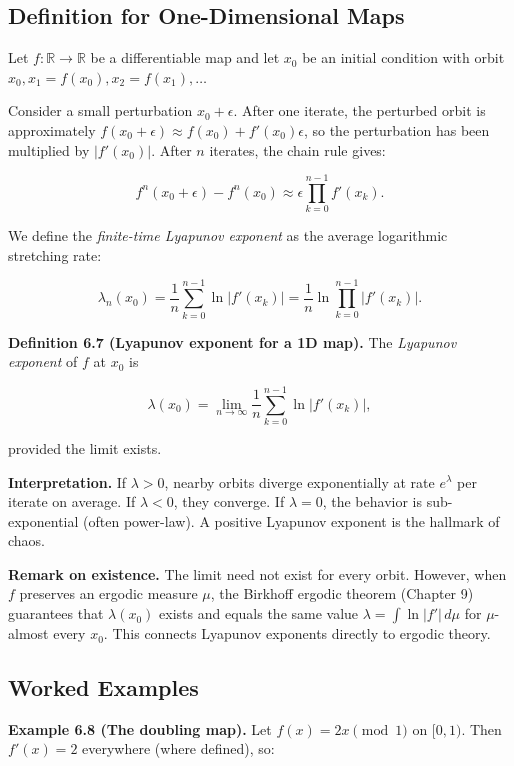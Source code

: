 \subsection{Definition for One-Dimensional Maps}\label{sec:6.3.1}

Let $f: \mathbb{R} \to \mathbb{R}$ be a differentiable map and let $x_0$ be an initial condition with orbit $x_0, x_1 = f(x_0), x_2 = f(x_1), \ldots$

Consider a small perturbation $x_0 + \epsilon$. After one iterate, the perturbed orbit is approximately $f(x_0 + \epsilon) \approx f(x_0) + f'(x_0)\epsilon$, so the perturbation has been multiplied by $|f'(x_0)|$. After $n$ iterates, the chain rule gives:

\[
f^n(x_0 + \epsilon) - f^n(x_0) \approx \epsilon \prod_{k=0}^{n-1} f'(x_k).
\]

We define the \textit{finite-time Lyapunov exponent} as the average logarithmic stretching rate:

\[
\lambda_n(x_0) = \frac{1}{n} \sum_{k=0}^{n-1} \ln |f'(x_k)| = \frac{1}{n} \ln \prod_{k=0}^{n-1} |f'(x_k)|.
\]

\textbf{Definition 6.7 (Lyapunov exponent for a 1D map).} The \textit{Lyapunov exponent} of $f$ at $x_0$ is

\[
\lambda(x_0) = \lim_{n \to \infty} \frac{1}{n} \sum_{k=0}^{n-1} \ln |f'(x_k)|,
\]

provided the limit exists.

\textbf{Interpretation.} If $\lambda > 0$, nearby orbits diverge exponentially at rate $e^{\lambda}$ per iterate on average. If $\lambda < 0$, they converge. If $\lambda = 0$, the behavior is sub-exponential (often power-law). A positive Lyapunov exponent is the hallmark of chaos.

\textbf{Remark on existence.} The limit need not exist for every orbit. However, when $f$ preserves an ergodic measure $\mu$, the Birkhoff ergodic theorem (Chapter 9) guarantees that $\lambda(x_0)$ exists and equals the same value $\lambda = \int \ln |f'| \, d\mu$ for $\mu$-almost every $x_0$. This connects Lyapunov exponents directly to ergodic theory.

\subsection{Worked Examples}\label{sec:6.3.2}

\textbf{Example 6.8 (The doubling map).} Let $f(x) = 2x \pmod{1}$ on $[0,1)$. Then $f'(x) = 2$ everywhere (where defined), so:

